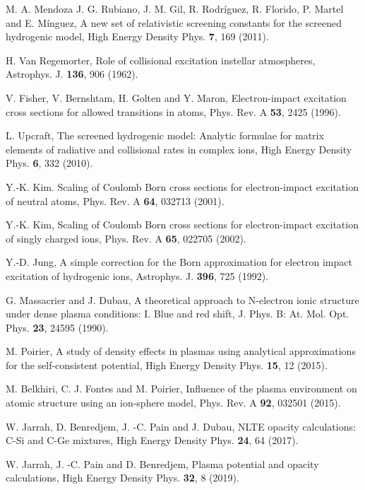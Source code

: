 \documentclass[a4paper,10pt]{article}
\begin{document}
\begin{thebibliography}{99}
 M. A. Mendoza  J. G. Rubiano, J. M. Gil, R. Rodr\'iguez, R. Florido, P. Martel and E. M\'inguez, A new set of relativistic screening constants for the screened hydrogenic model, High Energy Density Phys. {\bf 7}, 169 (2011).

H. Van Regemorter, Role of collisional excitation instellar atmospheres, Astrophys. J. {\bf 136}, 906 (1962).

 V. Fisher, V. Bernshtam, H. Golten and Y. Maron, Electron-impact excitation cross sections for allowed transitions in atoms, Phys. Rev. A {\bf 53}, 2425 (1996).

L. Upcraft, The screened hydrogenic model: Analytic formulae for matrix elements of radiative and collisional rates in complex ions, High Energy Density Phys. {\bf 6}, 332 (2010).

Y.-K. Kim. Scaling of Coulomb Born cross sections for electron-impact excitation of neutral atoms, Phys. Rev. A {\bf 64}, 032713 (2001).

Y.-K. Kim, Scaling of Coulomb Born cross sections for electron-impact excitation of singly charged ions, Phys. Rev. A {\bf 65}, 022705 (2002).

Y.-D. Jung, A simple correction for the Born approximation for electron impact excitation of hydrogenic ions, Astrophys. J. {\bf 396}, 725 (1992).

G. Massacrier and J. Dubau, A theoretical approach to N-electron ionic structure under dense plasma conditions: I. Blue and red shift, J. Phys. B: At. Mol. Opt. Phys. {\bf 23}, 24595 (1990).

M. Poirier, A study of density effects in plasmas using analytical approximations for the self-consistent potential, High Energy Density Phys. {\bf 15}, 12 (2015).

M. Belkhiri, C. J. Fontes and M. Poirier, Influence of the plasma environment on atomic structure using an ion-sphere model, Phys. Rev. A {\bf 92}, 032501 (2015).

W. Jarrah, D. Benredjem, J. -C. Pain and J. Dubau, NLTE opacity calculations: C-Si and C-Ge mixtures, High Energy Density Phys. {\bf 24}, 64 (2017).

W. Jarrah, J. -C. Pain and D. Benredjem, Plasma potential and opacity calculations, High Energy Density Phys. {\bf 32}, 8 (2019).


\end{thebibliography}
\end{document}
